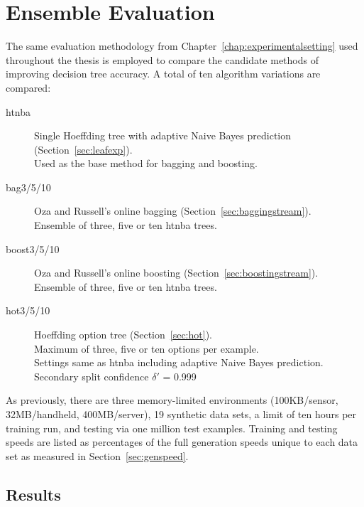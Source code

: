 \chapter{Ensemble Evaluation}
\label{chap:improvecompare}

The same evaluation methodology from Chapter~\ref{chap:experimentalsetting} used throughout the thesis is employed to compare the candidate methods of improving decision tree accuracy.
A total of ten algorithm variations are compared:
\begin{description}
\item[{\sc htnba}] Single Hoeffding tree with adaptive Naive Bayes prediction (Section~\ref{sec:leafexp}).\\
Used as the base method for bagging and boosting.
\item[{\sc bag3/5/10}] Oza and Russell's online bagging (Section~\ref{sec:baggingstream}).\\
Ensemble of three, five or ten {\sc htnba} trees.
\item[{\sc boost3/5/10}] Oza and Russell's online boosting (Section~\ref{sec:boostingstream}).\\
Ensemble of three, five or ten {\sc htnba} trees.
\item[{\sc hot3/5/10}] Hoeffding option tree (Section~\ref{sec:hot}).\\
Maximum of three, five or ten options per example.\\
Settings same as {\sc htnba} including adaptive Naive Bayes prediction.\\
Secondary split confidence $\delta'$ = 0.999
\end{description}
As previously, there are three memory-limited environments (100KB/sensor, 32MB/handheld, 400MB/server), 19 synthetic data sets, a limit of ten hours per training run, and testing via one million test examples. Training and testing speeds are listed as percentages of the full generation speeds unique to each data set as measured in Section~\ref{sec:genspeed}.

\section{Results}
\label{sec:ensexp}

